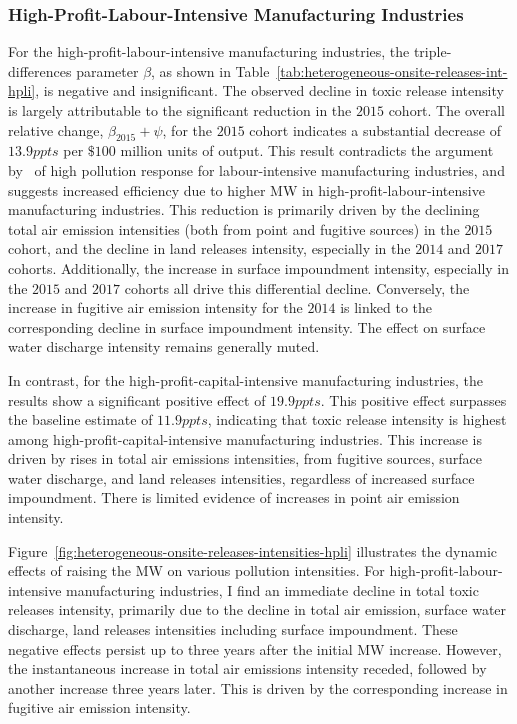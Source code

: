 \documentclass[authoryear, preprint, twocolumn, 1p]{elsarticle}
\begin{document}
    \subsubsection{High-Profit-Labour-Intensive Manufacturing Industries}
    For the high-profit-labour-intensive manufacturing industries, the triple-differences parameter $\beta$, as shown in Table~\ref{tab:heterogeneous-onsite-releases-int-hpli}, is negative and insignificant. The observed decline in toxic release intensity is largely attributable to the significant reduction in the $2015$ cohort. The overall relative change, $\beta_{2015} + \psi$, for the $2015$ cohort indicates a substantial decrease of $13.9ppts$ per $\$100$ million units of output. This result contradicts the argument by~\citet{zhang2023unintended} of high pollution response for labour-intensive manufacturing industries, and suggests increased efficiency due to higher MW in high-profit-labour-intensive manufacturing industries. This reduction is primarily driven by the declining total air emission intensities (both from point and fugitive sources) in the $2015$ cohort, and the decline in land releases intensity, especially in the $2014$ and $2017$ cohorts. Additionally, the increase in surface impoundment intensity, especially in the $2015$ and $2017$ cohorts all drive this differential decline. Conversely, the increase in fugitive air emission intensity for the $2014$ is linked to the corresponding decline in surface impoundment intensity. The effect on surface water discharge intensity remains generally muted.
    

    In contrast, for the high-profit-capital-intensive manufacturing industries, the results show a significant positive effect of $19.9ppts$. This positive effect surpasses the baseline estimate of $11.9ppts$, indicating that toxic release intensity is highest among high-profit-capital-intensive manufacturing industries. This increase is driven by rises in total air emissions intensities, from fugitive sources, surface water discharge, and land releases intensities, regardless of increased surface impoundment. There is limited evidence of increases in point air emission intensity.

    Figure~\ref{fig:heterogeneous-onsite-releases-intensities-hpli} illustrates the dynamic effects of raising the MW on various pollution intensities. For high-profit-labour-intensive manufacturing industries, I find an immediate decline in total toxic releases intensity, primarily due to the decline in total air emission, surface water discharge, land releases intensities including surface impoundment. These negative effects persist up to three years after the initial MW increase. However, the instantaneous increase in total air emissions intensity receded, followed by another increase three years later. This is driven by the corresponding increase in fugitive air emission intensity.
    
\end{document}
